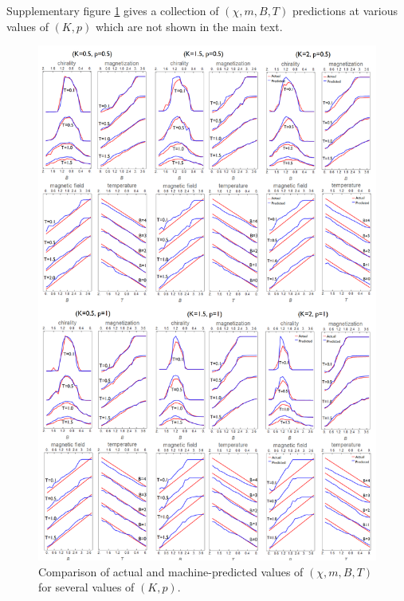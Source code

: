 \documentclass[reprint,amsmath,amssymb,aps,showpacs,onecolumn,superscriptaddress,prb]{revtex4-1}
\begin{document}
\begin{widetext}
Supplementary figure \ref{fig:SM2} gives a collection of $(\chi, m, B, T)$ predictions at various values of $(K,p)$ which are not shown in the main text.

\begin{figure}[ht]
\includegraphics[scale=0.45]{SMfig4.png}
\caption{Comparison of actual and machine-predicted values of $(\chi, m, B, T)$ for several values of $(K,p)$.}\label{fig:SM2}
\end{figure}
\end{widetext}


\begin{thebibliography}{99}
\end{thebibliography}
\end{document}
